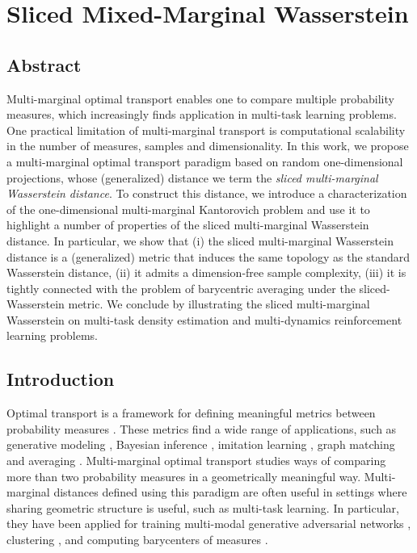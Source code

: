 \chapter{Sliced Mixed-Marginal Wasserstein}


\section{Abstract}
	Multi-marginal optimal transport enables one to compare multiple probability measures, which increasingly finds application in multi-task learning problems.
	One practical limitation of multi-marginal transport is computational scalability in the number of measures, samples and dimensionality.
	In this work, we propose a multi-marginal optimal transport paradigm based on random one-dimensional projections, whose (generalized) distance we term the \emph{sliced multi-marginal Wasserstein distance}.
	To construct this distance, we introduce a characterization of the one-dimensional multi-marginal Kantorovich problem and use it to highlight a number of properties of the sliced multi-marginal Wasserstein distance. 
	In particular, we show that (i) the sliced multi-marginal Wasserstein distance is a (generalized) metric that induces the same topology as the standard Wasserstein distance, (ii) it admits a dimension-free sample complexity, (iii) it is tightly connected with the problem of barycentric averaging under the sliced-Wasserstein metric.
	We conclude by illustrating the sliced multi-marginal Wasserstein on multi-task density estimation and multi-dynamics reinforcement learning problems.

\section{Introduction}

Optimal transport is a framework for defining meaningful metrics between probability measures \cite{villani, compopt}. 
These metrics find a wide range of applications, such as generative modeling \cite{pmlr-v84-genevay18a,bunne2019}, Bayesian inference \cite{bayes}, imitation learning \cite{Dadashi2020PrimalWI}, graph matching and averaging \cite{pmlr-v97-xu19b,NIPS2019_8569}.
Multi-marginal optimal transport \cite{gangbo} studies ways of comparing more than two probability measures in a geometrically meaningful way.
Multi-marginal distances defined using this paradigm are often useful in settings where sharing geometric structure is useful, such as multi-task learning. In particular, they have been applied for training multi-modal generative adversarial networks \cite{mwgan}, clustering  \cite{generalizedmet}, and computing barycenters of measures \cite{altschuler_mm}.


